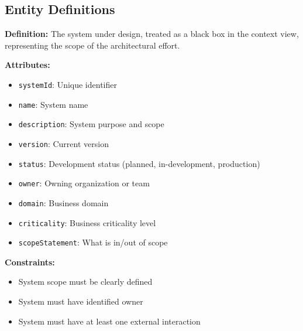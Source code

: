 \documentclass[11pt,letterpaper]{article}
\begin{document}
\subsection{Entity Definitions}

\begin{definitionbox}
\textbf{Definition:} The system under design, treated as a black box in the context view, representing the scope of the architectural effort.

\textbf{Attributes:}
\begin{itemize}[nosep]
    \item \texttt{systemId}: Unique identifier
    \item \texttt{name}: System name
    \item \texttt{description}: System purpose and scope
    \item \texttt{version}: Current version
    \item \texttt{status}: Development status (planned, in-development, production)
    \item \texttt{owner}: Owning organization or team
    \item \texttt{domain}: Business domain
    \item \texttt{criticality}: Business criticality level
    \item \texttt{scopeStatement}: What is in/out of scope
\end{itemize}

\textbf{Constraints:}
\begin{itemize}[nosep]
    \item System scope must be clearly defined
    \item System must have identified owner
    \item System must have at least one external interaction
\end{itemize}
\end{definitionbox}
\end{document}
